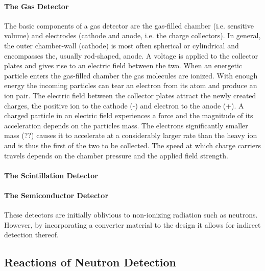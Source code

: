 \paragraph{The Gas Detector} \newline
The basic components of a gas detector are the gas-filled chamber (i.e. sensitive volume) and electrodes (cathode and anode, i.e. the charge collectors). In general, the outer chamber-wall (cathode) is most often spherical or cylindrical and encompasses the, usually rod-shaped, anode.  A voltage is applied to the collector plates and gives rise to an electric field between the two.
When an energetic particle enters the gas-filled chamber the gas molecules are ionized. With enough energy the incoming particles can tear an electron from its atom and produce an ion pair. The electric field between the collector plates attract the newly created charges, the positive ion to the cathode (-) and electron to the anode (+).
A charged particle in an electric field experiences a force and the magnitude of its acceleration depends on the particles mass. The electrons significantly smaller mass (??) causes it to accelerate at a considerably larger rate than the heavy ion and is thus the first of the two to be collected. The speed at which charge carriers travels depends on the chamber pressure and the applied field strength.

\paragraph{The Scintillation Detector} \newline

\paragraph{The Semiconductor Detector} \newline

These detectors are initially oblivious to non-ionizing radiation such as neutrons. However, by incorporating a converter material to the design it allows for indirect detection thereof.

\subsection{Reactions of Neutron Detection}

